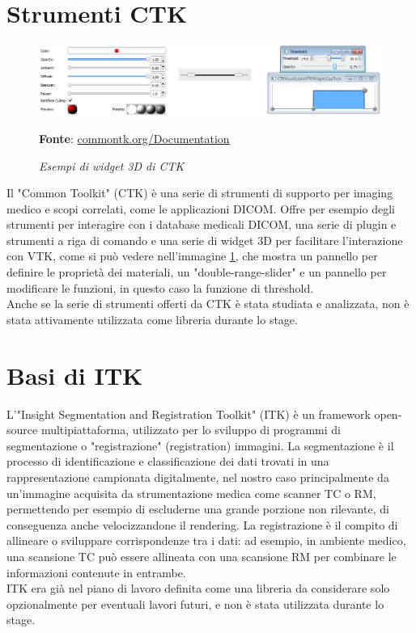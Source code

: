 \section{Strumenti CTK}
\begin{figure}[h]
    \centering
    \includegraphics[scale=0.35]{immagini/volumerendering/ctkwidgets.png}
    \caption{\textit{Esempi di widget 3D di CTK}}
    \textbf{Fonte}: \href{https://commontk.org/index.php/Documentation/ImageGallery}{commontk.org/Documentation}
    \label{fig: CTK 3D Widgets}
\end{figure}

Il "Common Toolkit" (CTK) è una serie di strumenti di supporto per imaging medico e scopi correlati, come le applicazioni DICOM. Offre per esempio degli strumenti per interagire con i database medicali DICOM, una serie di plugin e strumenti a riga di comando e una serie di widget 3D per facilitare l'interazione con VTK, come si può vedere nell'immagine \ref{fig: CTK 3D Widgets}, che mostra un pannello per definire le proprietà dei materiali, un "double-range-slider" e un pannello per modificare le funzioni, in questo caso la funzione di threshold.
\\
Anche se la serie di strumenti offerti da CTK è stata studiata e analizzata, non è stata attivamente utilizzata come libreria durante lo stage.

\section{Basi di ITK}

L'"Insight Segmentation and Registration Toolkit" (ITK) è un framework open-source multipiattaforma, utilizzato per lo sviluppo di programmi di segmentazione o "registrazione" (registration) immagini. La segmentazione è il processo di identificazione e classificazione dei dati trovati in una rappresentazione campionata digitalmente, nel nostro caso principalmente da un'immagine acquisita da strumentazione medica come scanner TC o RM, permettendo per esempio di escluderne una grande porzione non rilevante, di conseguenza anche velocizzandone il rendering. La registrazione è il compito di allineare o sviluppare corrispondenze tra i dati: ad esempio, in ambiente medico, una scansione TC può essere allineata con una scansione RM per combinare le informazioni contenute in entrambe.
\\
ITK era già nel piano di lavoro definita come una libreria da considerare solo opzionalmente per eventuali lavori futuri, e non è stata utilizzata durante lo stage.

